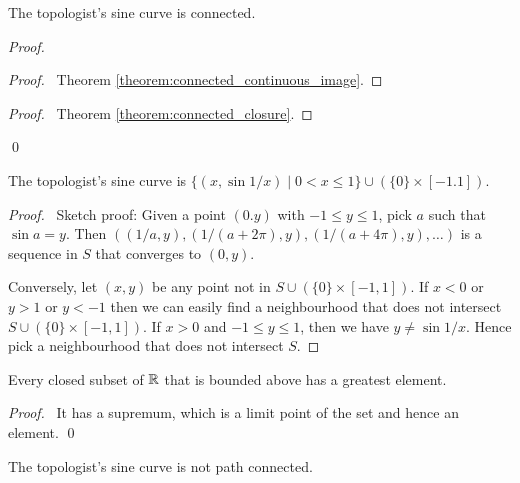 \begin{proposition}
    The topologist's sine curve is connected.
\end{proposition}

\begin{proof}
    \pf
    \begin{proof}
        \pf\ Theorem \ref{theorem:connected_continuous_image}.
    \end{proof}
    \begin{proof}
        \pf\ Theorem \ref{theorem:connected_closure}.
    \end{proof}
    \qed
\end{proof}

\begin{proposition}
    The topologist's sine curve is $\{ (x, \sin 1/x) \mid 0 < x \leq 1 \}
    \cup (\{0\} \times [-1.1])$.
\end{proposition}

\begin{proof}
    \pf\ Sketch proof: Given a point $(0.y)$ with $-1 \leq y \leq 1$, pick $a$ such that $\sin a = y$. Then $((1/a,y), (1/(a+2\pi),y), (1/(a+4\pi),y), \ldots)$ is a sequence
    in $S$ that converges to $(0,y)$.

    Conversely, let $(x,y)$ be any point not in $S \cup (\{0\} \times [-1,1])$. If $x < 0$ or $y > 1$ or $y < -1$ then we can easily find a neighbourhood that does not intersect
    $S \cup (\{0\} \times [-1,1])$. If $x > 0$ and $-1 \leq y \leq 1$, then we have $y \neq \sin 1/x$. Hence pick a neighbourhood that does not intersect $S$.
\end{proof}

\begin{proposition}
    \label{proposition:greatest_element_closed}
    Every closed subset of $\mathbb{R}$ that is bounded above has a greatest element.
\end{proposition}

\begin{proof}
    \pf\ It has a supremum, which is a limit point of the set and hence an element. \qed
\end{proof}

\begin{proposition}[CC]
    The topologist's sine curve is not path connected.
\end{proposition}

